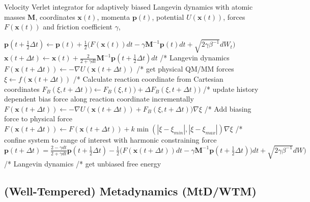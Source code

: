\begin{algorithm}[H]
  \caption{Velocity Verlet integrator for adaptively biased Langevin dynamics with atomic masses $\textbf{M}$, coordinates $\textbf{x}(t)$, momenta $\textbf{p}(t)$, potential $U(\textbf{x}(t))$, forces $F(\textbf{x}(t))$ and friction coefficient $\gamma$,}
  \label{alg:ABM}
    \begin{algorithmic}
        \STATE
        \STATE $\textbf{p}(t+\frac{1}{2}\Delta t) \leftarrow \textbf{p}(t) + \frac{1}{2} \bigl(F(\textbf{x}(t))dt-\gamma \textbf{M}^{-1}\textbf{p}(t) dt + \sqrt{2\gamma\beta^{-1}}dW_t \bigr)$
        \STATE $\textbf{x}(t+\Delta t) \leftarrow \textbf{x}(t) + \frac{2}{2+\gamma dt}\textbf{M}^{-1} \textbf{p}(t+\frac{1}{2}\Delta t) dt$
        \STATE /* Langevin dynamics
        \STATE
        \STATE $F(\textbf{x}(t+\Delta t)) \leftarrow -\nabla U(\textbf{x}(t+\Delta t))$
        \STATE /* get physical QM/MM forces
        \STATE
        \STATE $\xi \leftarrow f(\textbf{x}(t+\Delta t))$
        \STATE /* Calculate reaction coordinate from Cartesian coordinates
        \STATE
          \STATE
          \STATE $F_{B}(\xi, t+\Delta t))\leftarrow F_{B}(\xi, t))+\Delta F_{B}(\xi,t+\Delta t))$
          \STATE /* update history dependent bias force along reaction coordinate incrementally
          \STATE
          \STATE $F(\textbf{x}(t+\Delta t)) \leftarrow -\nabla U(\textbf{x}(t+\Delta t)) + F_{B}(\xi, t+\Delta t))\nabla\xi$
          \STATE /* Add biasing force to physical force
          \STATE
        \ELSE
          \STATE
          \STATE $F(\textbf{x}(t+\Delta t)) \leftarrow F(\textbf{x}(t+\Delta t)) + k\min(|\xi-\xi_{min}|,|\xi-\xi_{max}|)\nabla\xi$
          \STATE /* confine system to range of interest with harmonic constraining force
          \STATE
        \ENDIF
        \STATE
        \STATE $\textbf{p}(t+\Delta t) = \frac{2 - \gamma dt}{2+\gamma dt} \textbf{p}(t+\frac{1}{2}\Delta t) - \frac{1}{2} \bigl(F(\textbf{x}(t+\Delta t))dt-\gamma \textbf{M}^{-1}\textbf{p}(t+\frac{1}{2}\Delta t)) dt + \sqrt{2\gamma\beta^{-1}}dW\bigr)$
        \STATE /* Langevin dynamics
        \STATE
      \ENDWHILE
      \STATE /* get unbiased free energy
    \end{algorithmic}
\end{algorithm}

\newpage
\subsection{(Well-Tempered) Metadynamics (MtD/WTM)}
\label{sec:metaD}

